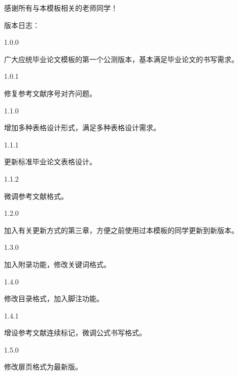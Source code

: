 \acknowledgement
感谢所有与本模板相关的老师同学！\par
版本日志：\par
1.0.0\par
广大应统毕业论文模板的第一个公测版本，基本满足毕业论文的书写需求。\par
1.0.1\par
修复参考文献序号对齐问题。\par
1.1.0\par
增加多种表格设计形式，满足多种表格设计需求。\par
1.1.1\par
更新标准毕业论文表格设计。\par
1.1.2\par
微调参考文献格式。\par
1.2.0\par
加入有关更新方式的第三章，方便之前使用过本模板的同学更新到新版本。\par
1.3.0\par
加入附录功能，修改关键词格式。\par
1.4.0\par
修改目录格式，加入脚注功能。\par
1.4.1\par
增设参考文献连续标记，微调公式书写格式。\par
1.5.0\par
修改扉页格式为最新版。
\newpage
\cleardoublepage